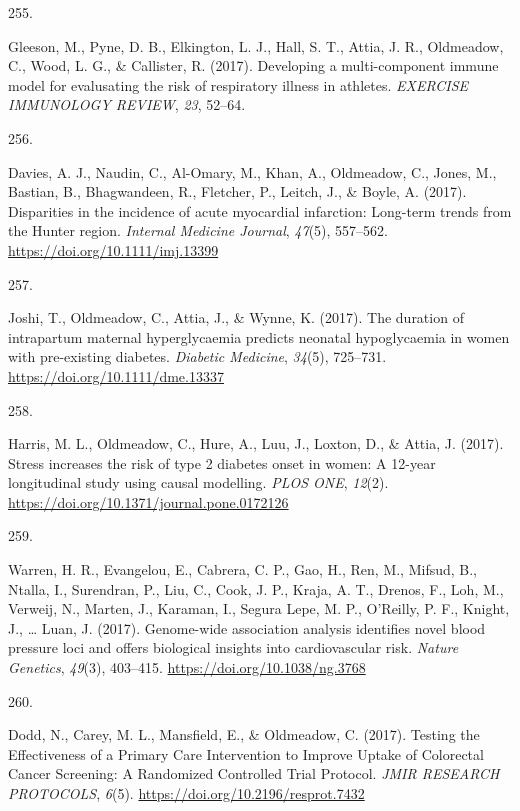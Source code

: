 \documentclass[11pt, a4paper]{awesome-cv}
\newlength{\csllabelwidth}
\newcommand{\CSLLeftMargin}[1]{\parbox[t]{\csllabelwidth}{#1}}
\newcommand{\CSLRightInline}[1]{\parbox[t]{\linewidth - \csllabelwidth}{#1}}
\begin{document}
\leavevmode\hypertarget{ref-gleeson_developing_2017}{}%
\CSLLeftMargin{255. }
\CSLRightInline{Gleeson, M., Pyne, D. B., Elkington, L. J., Hall, S. T.,
Attia, J. R., Oldmeadow, C., Wood, L. G., \& Callister, R. (2017).
Developing a multi-component immune model for evalusating the risk of
respiratory illness in athletes. \emph{EXERCISE IMMUNOLOGY REVIEW},
\emph{23}, 52--64.}

\leavevmode\hypertarget{ref-davies_disparities_2017}{}%
\CSLLeftMargin{256. }
\CSLRightInline{Davies, A. J., Naudin, C., Al-Omary, M., Khan, A.,
Oldmeadow, C., Jones, M., Bastian, B., Bhagwandeen, R., Fletcher, P.,
Leitch, J., \& Boyle, A. (2017). Disparities in the incidence of acute
myocardial infarction: Long-term trends from the Hunter region.
\emph{Internal Medicine Journal}, \emph{47}(5), 557--562.
\url{https://doi.org/10.1111/imj.13399}}

\leavevmode\hypertarget{ref-joshi_duration_2017}{}%
\CSLLeftMargin{257. }
\CSLRightInline{Joshi, T., Oldmeadow, C., Attia, J., \& Wynne, K.
(2017). The duration of intrapartum maternal hyperglycaemia predicts
neonatal hypoglycaemia in women with pre-existing diabetes.
\emph{Diabetic Medicine}, \emph{34}(5), 725--731.
\url{https://doi.org/10.1111/dme.13337}}

\leavevmode\hypertarget{ref-harris_stress_2017}{}%
\CSLLeftMargin{258. }
\CSLRightInline{Harris, M. L., Oldmeadow, C., Hure, A., Luu, J., Loxton,
D., \& Attia, J. (2017). Stress increases the risk of type 2 diabetes
onset in women: A 12-year longitudinal study using causal modelling.
\emph{PLOS ONE}, \emph{12}(2).
\url{https://doi.org/10.1371/journal.pone.0172126}}

\leavevmode\hypertarget{ref-warren_genome-wide_2017-1}{}%
\CSLLeftMargin{259. }
\CSLRightInline{Warren, H. R., Evangelou, E., Cabrera, C. P., Gao, H.,
Ren, M., Mifsud, B., Ntalla, I., Surendran, P., Liu, C., Cook, J. P.,
Kraja, A. T., Drenos, F., Loh, M., Verweij, N., Marten, J., Karaman, I.,
Segura Lepe, M. P., O'Reilly, P. F., Knight, J., \ldots{} Luan, J.
(2017). Genome-wide association analysis identifies novel blood pressure
loci and offers biological insights into cardiovascular risk.
\emph{Nature Genetics}, \emph{49}(3), 403--415.
\url{https://doi.org/10.1038/ng.3768}}

\leavevmode\hypertarget{ref-dodd_testing_2017}{}%
\CSLLeftMargin{260. }
\CSLRightInline{Dodd, N., Carey, M. L., Mansfield, E., \& Oldmeadow, C.
(2017). Testing the Effectiveness of a Primary Care Intervention to
Improve Uptake of Colorectal Cancer Screening: A Randomized Controlled
Trial Protocol. \emph{JMIR RESEARCH PROTOCOLS}, \emph{6}(5).
\url{https://doi.org/10.2196/resprot.7432}}
\end{document}
